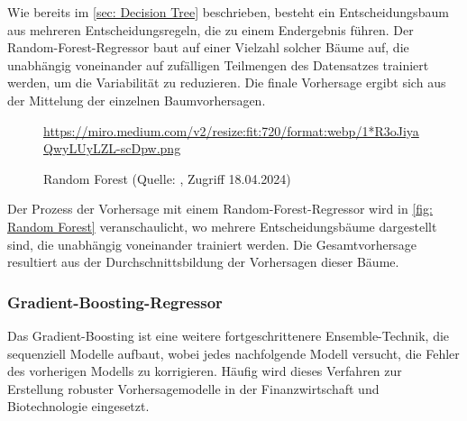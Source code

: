 Wie bereits im \autoref{sec: Decision Tree} beschrieben, besteht ein Entscheidungsbaum aus mehreren Entscheidungsregeln, die zu einem Endergebnis führen. Der Random-Forest-Regressor baut auf einer Vielzahl solcher Bäume auf, die unabhängig voneinander auf zufälligen Teilmengen des Datensatzes trainiert werden, um die Variabilität zu reduzieren. Die finale Vorhersage ergibt sich aus der Mittelung der einzelnen Baumvorhersagen.

\begin{figure}[H]
    \centering
    \urldef{\myurl}\url{https://miro.medium.com/v2/resize:fit:720/format:webp/1*R3oJiyaQwyLUyLZL-scDpw.png}
    \caption[Random Forest]{Random Forest (Quelle: \protect\myurl{}, Zugriff 18.04.2024)}
    \label{fig: Random Forest}
\end{figure}

Der Prozess der Vorhersage mit einem Random-Forest-Regressor wird in \autoref{fig: Random Forest} veranschaulicht, wo mehrere Entscheidungsbäume dargestellt sind, die unabhängig voneinander trainiert werden. Die Gesamtvorhersage resultiert aus der Durchschnittsbildung der Vorhersagen dieser Bäume.

\subsubsection{Gradient-Boosting-Regressor}
Das Gradient-Boosting ist eine weitere fortgeschrittenere Ensemble-Technik, die sequenziell Modelle aufbaut, wobei jedes nachfolgende Modell versucht, die Fehler des vorherigen Modells zu korrigieren. Häufig wird dieses Verfahren zur Erstellung robuster Vorhersagemodelle in der Finanzwirtschaft und Biotechnologie eingesetzt.

